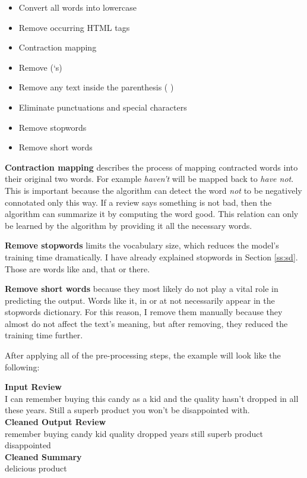 \begin{tcolorbox}
	\begin{itemize}
		\item Convert all words into lowercase
		\item Remove occurring HTML tags
		\item Contraction mapping
		\item Remove (‘s)
		\item Remove any text inside the parenthesis ( )
		\item Eliminate punctuations and special characters
		\item Remove stopwords
		\item Remove short words
	\end{itemize}
\end{tcolorbox}

\textbf{Contraction mapping} describes the process of mapping contracted words into their original two words. For example \textit{haven't} will be mapped back to \textit{have not}. This is important because the algorithm can detect the word \textit{not} to be negatively connotated only this way. If a review says something is not bad, then the algorithm can summarize it by computing the word good. This relation can only be learned by the algorithm by providing it all the necessary words.

\textbf{Remove stopwords} limits the vocabulary size, which reduces the model's training time dramatically. I have already explained stopwords in Section \ref{ss:sd}. Those are words like and, that or there. 

\textbf{Remove short words} because they most likely do not play a vital role in predicting the output. Words like it, in or at not necessarily appear in the stopwords dictionary. For this reason, I remove them manually because they almost do not affect the text's meaning, but after removing, they reduced the training time further. 

After applying all of the pre-processing steps, the example will look like the following:

\begin{tcolorbox}
	\textbf{Input Review} \\
	I can remember buying this candy as a kid and the quality hasn't dropped in all these years. Still a superb product you won't be disappointed with. \\
	
	\textbf{Cleaned Output Review} \\
	remember buying candy kid quality dropped years still superb product disappointed \\
	
	\textbf{Cleaned Summary} \\
	delicious product
\end{tcolorbox}

